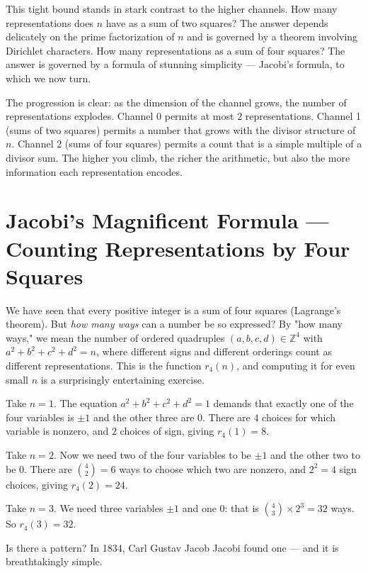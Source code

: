 This tight bound stands in stark contrast to the higher channels. How many representations does $n$ have as a sum of two squares? The answer depends delicately on the prime factorization of $n$ and is governed by a theorem involving Dirichlet characters. How many representations as a sum of four squares? The answer is governed by a formula of stunning simplicity --- Jacobi's formula, to which we now turn.

The progression is clear: as the dimension of the channel grows, the number of representations explodes. Channel 0 permits at most $2$ representations. Channel 1 (sums of two squares) permits a number that grows with the divisor structure of $n$. Channel 2 (sums of four squares) permits a count that is a simple multiple of a divisor sum. The higher you climb, the richer the arithmetic, but also the more information each representation encodes.

\bigskip

\section*{Jacobi's Magnificent Formula --- Counting Representations by Four Squares}

We have seen that every positive integer is a sum of four squares (Lagrange's theorem). But \textit{how many ways} can a number be so expressed? By "how many ways," we mean the number of ordered quadruples $(a, b, c, d) \in \mathbb{Z}^4$ with $a^2 + b^2 + c^2 + d^2 = n$, where different signs and different orderings count as different representations. This is the function $r_4(n)$, and computing it for even small $n$ is a surprisingly entertaining exercise.

Take $n = 1$. The equation $a^2 + b^2 + c^2 + d^2 = 1$ demands that exactly one of the four variables is $\pm 1$ and the other three are $0$. There are $4$ choices for which variable is nonzero, and $2$ choices of sign, giving $r_4(1) = 8$.

Take $n = 2$. Now we need two of the four variables to be $\pm 1$ and the other two to be $0$. There are $\binom{4}{2} = 6$ ways to choose which two are nonzero, and $2^2 = 4$ sign choices, giving $r_4(2) = 24$.

Take $n = 3$. We need three variables $\pm 1$ and one $0$: that is $\binom{4}{3} \times 2^3 = 32$ ways. So $r_4(3) = 32$.

Is there a pattern? In 1834, Carl Gustav Jacob Jacobi found one --- and it is breathtakingly simple.

